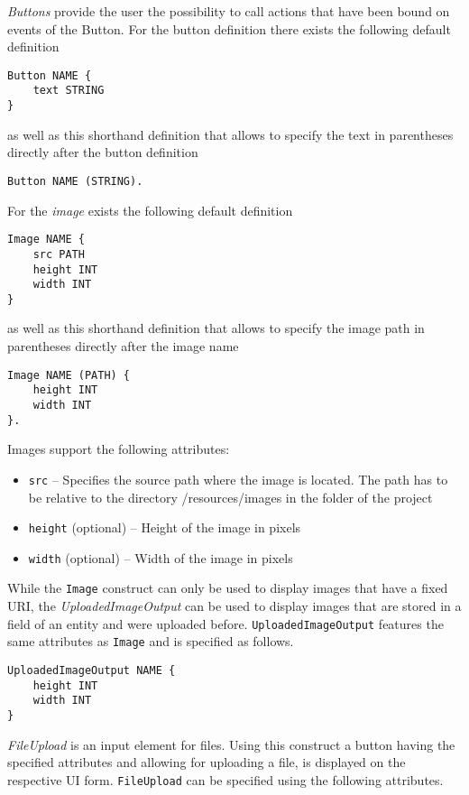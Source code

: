 \textit{Buttons} provide the user the possibility to call actions that have been bound on events of the Button. For the button definition there exists the following default definition
\begin{lstlisting}
Button NAME {
	text STRING
}
\end{lstlisting}
as well as this shorthand definition that allows to specify the text in parentheses directly after the button definition
\begin{lstlisting}
Button NAME (STRING).
\end{lstlisting}


For the \textit{image} exists the following default definition
\begin{lstlisting}
Image NAME {
	src PATH
	height INT
	width INT
}
\end{lstlisting}
as well as this shorthand definition that allows to specify the image path in parentheses directly after the image name
\begin{lstlisting}
Image NAME (PATH) {
	height INT
	width INT
}.
\end{lstlisting}
Images support the following attributes:
\begin{itemize}
\item \lstinline!src! -- Specifies the source path where the image is located. The path has to be relative to the directory /resources/images in the folder of the \MD project
\item \lstinline!height! (optional) -- Height of the image in pixels
\item \lstinline!width! (optional) -- Width of the image in pixels
\end{itemize}


While the \lstinline!Image! construct can only be used to display images that have a fixed URI, the \textit{UploadedImageOutput} can be used to display images that are stored in a field of an entity and were uploaded before. \lstinline!UploadedImageOutput! features the same attributes as \lstinline!Image! and is specified as follows.

\begin{lstlisting}
UploadedImageOutput NAME {
	height INT
	width INT
}
\end{lstlisting}

\textit{FileUpload} is an input element for files. Using this construct a button having the specified attributes and allowing for uploading a file, is displayed on the respective UI form. \lstinline!FileUpload! can be specified using the following attributes.

